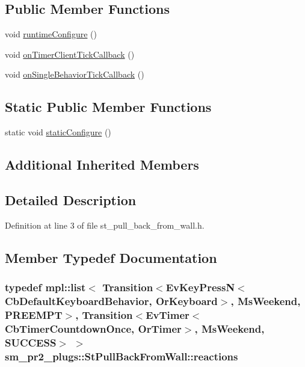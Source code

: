 \subsection*{Public Member Functions}
\begin{DoxyCompactItemize}
\item 
void \hyperlink{structsm__pr2__plugs_1_1StPullBackFromWall_a1be08c0cdc17a5c038cd8549118f98a6}{runtime\+Configure} ()
\item 
void \hyperlink{structsm__pr2__plugs_1_1StPullBackFromWall_a7872156a77c675539830c016e703c499}{on\+Timer\+Client\+Tick\+Callback} ()
\item 
void \hyperlink{structsm__pr2__plugs_1_1StPullBackFromWall_a42e04e36271bd14285b42df5c1988209}{on\+Single\+Behavior\+Tick\+Callback} ()
\end{DoxyCompactItemize}
\subsection*{Static Public Member Functions}
\begin{DoxyCompactItemize}
\item 
static void \hyperlink{structsm__pr2__plugs_1_1StPullBackFromWall_ac2b8294a8c707ed4a4bb867fac511f7f}{static\+Configure} ()
\end{DoxyCompactItemize}
\subsection*{Additional Inherited Members}


\subsection{Detailed Description}


Definition at line 3 of file st\+\_\+pull\+\_\+back\+\_\+from\+\_\+wall.\+h.



\subsection{Member Typedef Documentation}
\subsubsection[{\texorpdfstring{reactions}{reactions}}]{\setlength{\rightskip}{0pt plus 5cm}typedef mpl\+::list$<$ Transition$<$Ev\+Key\+PressN$<$Cb\+Default\+Keyboard\+Behavior, {\bf Or\+Keyboard}$>$, {\bf Ms\+Weekend}, {\bf P\+R\+E\+E\+M\+PT}$>$, Transition$<$Ev\+Timer$<$Cb\+Timer\+Countdown\+Once, {\bf Or\+Timer}$>$, {\bf Ms\+Weekend}, {\bf S\+U\+C\+C\+E\+SS}$>$ $>$ {\bf sm\+\_\+pr2\+\_\+plugs\+::\+St\+Pull\+Back\+From\+Wall\+::reactions}}\hypertarget{structsm__pr2__plugs_1_1StPullBackFromWall_a1270c0eceb6a7c34dc94440623cd9c1a}{}\label{structsm__pr2__plugs_1_1StPullBackFromWall_a1270c0eceb6a7c34dc94440623cd9c1a}


